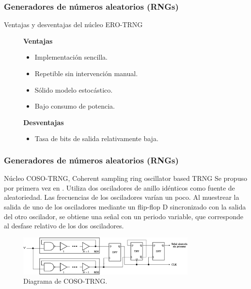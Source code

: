\documentclass[10pt]{beamer}
\begin{document}
\begin{frame}
    \frametitle{Generadores de números aleatorios (RNGs)}
    \begin{block}{Ventajas y desventajas del núcleo ERO-TRNG}
        \justifying
          \begin{figure}[!h]
				\begin{minipage}[t]{0.48\textwidth}
					\textbf{Ventajas}
					\begin{itemize}
						\justifying
						\item Implementación sencilla.
						\item Repetible sin intervención manual.
						\item Sólido modelo estocástico.
						\item Bajo consumo de potencia.
					\end{itemize}
				\end{minipage} \hfill \begin{minipage}[t]{0.48\textwidth}
					\textbf{Desventajas}
					\begin{itemize}
						\justifying
						\item Tasa de bits de salida relativamente baja.
					\end{itemize}
				\end{minipage}
			\end{figure}		
	\end{block}
\end{frame}


\begin{frame}
    \frametitle{Generadores de números aleatorios (RNGs)}
    \begin{block}{Núcleo COSO-TRNG, Coherent sampling ring oscillator based TRNG}
        \justifying
         Se propuso por primera vez en \cite{Kohlbrenner2004}. Utiliza dos osciladores de anillo idénticos como fuente de aleatoriedad. Las frecuencias de los osciladores varían un poco. Al muestrear la salida de uno de los osciladores mediante un flip-flop D sincronizado con la salida del otro oscilador, se obtiene una señal con un periodo variable, que corresponde al desfase relativo de los dos osciladores.
	\end{block}
	\begin{figure}[hbtp]
	    \centering
	    \includegraphics[width=0.8\textwidth]{A2_COSO_TRNG}
	    \caption{Diagrama de COSO-TRNG.}
        \label{fig:A2_COSO_TRNG}
    \end{figure}
\end{frame}
\end{document}
